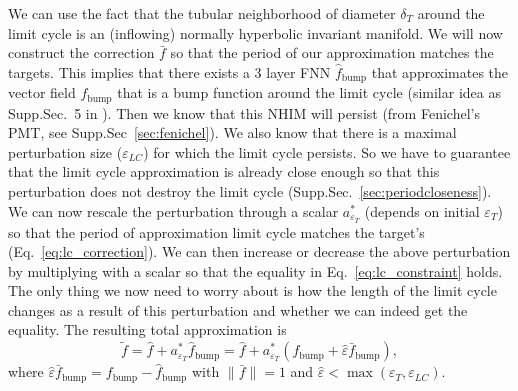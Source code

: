 \documentclass{article}
\theoremstyle{definition} \newtheorem{definition}{Definition}
\theoremstyle{remark} \newtheorem{remark}{Remark}
\newcounter{ct}
\begin{document}
We can use the fact that the tubular neighborhood of diameter $\delta_T$ around the limit cycle is an (inflowing) normally hyperbolic invariant manifold.
We will now construct the correction $\bar{f}$ so that the period of our approximation matches the targets.
This implies that there exists a 3 layer FNN $\hat f_{\operatorname{bump}}$ that approximates the vector field $f_{\operatorname{bump}}$ that is a bump function around the limit cycle (similar idea as Supp.Sec.~5 in \citep{Sagodi2024a}). %
Then we know that this NHIM will persist (from Fenichel's PMT, see Supp.Sec~\ref{sec:fenichel}).
We also know that there is a maximal perturbation size ($\varepsilon_{LC}$) for which the limit cycle persists.
So we have to guarantee that the limit cycle approximation is already close enough so that this perturbation does not destroy the limit cycle (Supp.Sec.~\ref{sec:periodcloseness}). %
We can now rescale the perturbation through a scalar $a_{\varepsilon_T}^*$ (depends on initial $\varepsilon_T$) so that the period of approximation limit cycle matches the target's (Eq.~\ref{eq:lc_correction}). 
We can then increase or decrease the above perturbation by multiplying with a scalar so that the equality in Eq.~\ref{eq:lc_constraint} holds.
The only thing we now need to worry about is how the length of the limit cycle changes as a result of this perturbation and whether we can indeed get the equality.
%
The resulting total approximation is %
\begin{equation}\label{eq:lc_correction}
\tilde{f}= \hat{f}+a_{\varepsilon_T}^*\hat f_{\operatorname{bump}} = 
 \hat{f} + a_{\varepsilon_T}^*(f_{\operatorname{bump}}+ \hat{\varepsilon}\bar{f}_{\operatorname{bump}}),
 \end{equation}
where $\hat{\varepsilon}\bar{f}_{\operatorname{bump}} = f_{\operatorname{bump}} -\hat f_{\operatorname{bump}}$ with $\|\bar f\|=1$ and $\hat \varepsilon <\max(\varepsilon_T,\varepsilon_{LC})$. %
%
\end{document}
